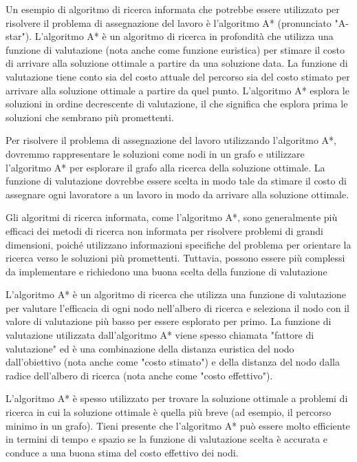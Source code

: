 Un esempio di algoritmo di ricerca informata che potrebbe essere utilizzato per risolvere il problema di assegnazione del lavoro è l'algoritmo A* (pronunciato "A-star"). L'algoritmo A* è un algoritmo di ricerca in profondità che utilizza una funzione di valutazione (nota anche come funzione euristica) per stimare il costo di arrivare alla soluzione ottimale a partire da una soluzione data. La funzione di valutazione tiene conto sia del costo attuale del percorso sia del costo stimato per arrivare alla soluzione ottimale a partire da quel punto. L'algoritmo A* esplora le soluzioni in ordine decrescente di valutazione, il che significa che esplora prima le soluzioni che sembrano più promettenti.

Per risolvere il problema di assegnazione del lavoro utilizzando l'algoritmo A*, dovremmo rappresentare le soluzioni come nodi in un grafo e utilizzare l'algoritmo A* per esplorare il grafo alla ricerca della soluzione ottimale. La funzione di valutazione dovrebbe essere scelta in modo tale da stimare il costo di assegnare ogni lavoratore a un lavoro in modo da arrivare alla soluzione ottimale.

Gli algoritmi di ricerca informata, come l'algoritmo A*, sono generalmente più efficaci dei metodi di ricerca non informata per risolvere problemi di grandi dimensioni, poiché utilizzano informazioni specifiche del problema per orientare la ricerca verso le soluzioni più promettenti. Tuttavia, possono essere più complessi da implementare e richiedono una buona scelta della funzione di valutazione

L'algoritmo A* è un algoritmo di ricerca che utilizza una funzione di valutazione per valutare l'efficacia di ogni nodo nell'albero di ricerca e seleziona il nodo con il valore di valutazione più basso per essere esplorato per primo. La funzione di valutazione utilizzata dall'algoritmo A* viene spesso chiamata "fattore di valutazione" ed è una combinazione della distanza euristica del nodo dall'obiettivo (nota anche come "costo stimato") e della distanza del nodo dalla radice dell'albero di ricerca (nota anche come "costo effettivo").

L'algoritmo A* è spesso utilizzato per trovare la soluzione ottimale a problemi di ricerca in cui la soluzione ottimale è quella più breve (ad esempio, il percorso minimo in un grafo). Tieni presente che l'algoritmo A* può essere molto efficiente in termini di tempo e spazio se la funzione di valutazione scelta è accurata e conduce a una buona stima del costo effettivo dei nodi.

